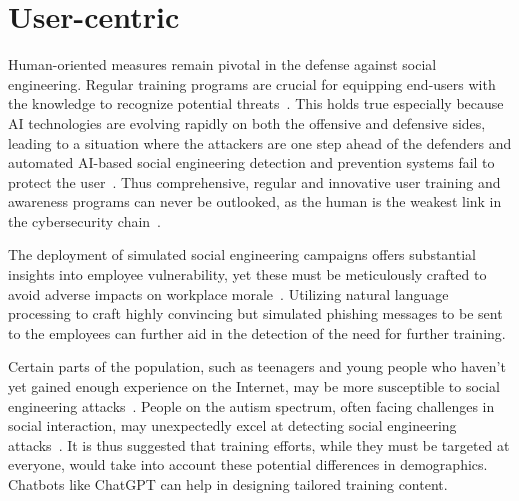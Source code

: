 \section{User-centric}
\begin{comment}    
    - Deepfake content detection
    - Spear phishing detection
\end{comment}

Human-oriented measures remain pivotal in the defense against social engineering. Regular training programs are crucial for equipping end-users with the knowledge to recognize potential threats~\citep{hadnagy_Social_Engineering_The_Science_2018}. This holds true especially because AI technologies are evolving rapidly on both the offensive and defensive sides, leading to a situation where the attackers are one step ahead of the defenders and automated AI-based social engineering detection and prevention systems fail to protect the user~\citep{fakhouri_AI_Driven_Solutions_SE_Attacks_2024}. Thus comprehensive, regular and innovative user training and awareness programs can never be outlooked, as the human is the weakest link in the cybersecurity chain~\citep{mitnick_The_Art_of_Deception_2003}.

The deployment of simulated social engineering campaigns offers substantial insights into employee vulnerability, yet these must be meticulously crafted to avoid adverse impacts on workplace morale~\citep{mitnick_The_Art_of_Deception_2003}. Utilizing natural language processing to craft highly convincing but simulated phishing messages to be sent to the employees can further aid in the detection of the need for further training.

%
%
Certain parts of the population, such as teenagers and young people who haven't yet gained enough experience on the Internet, may be more susceptible to social engineering attacks~\citep{nicholson_Investigating_Teenagers_Detect_Phishing_2020}. People on the autism spectrum, often facing challenges in social interaction, may unexpectedly excel at detecting social engineering attacks~\citep{neupane_Social_Disorders_Facilitate_SE_2018}. It is thus suggested that training efforts, while they must be targeted at everyone, would take into account these potential differences in demographics. Chatbots like ChatGPT can help in designing tailored training content.















